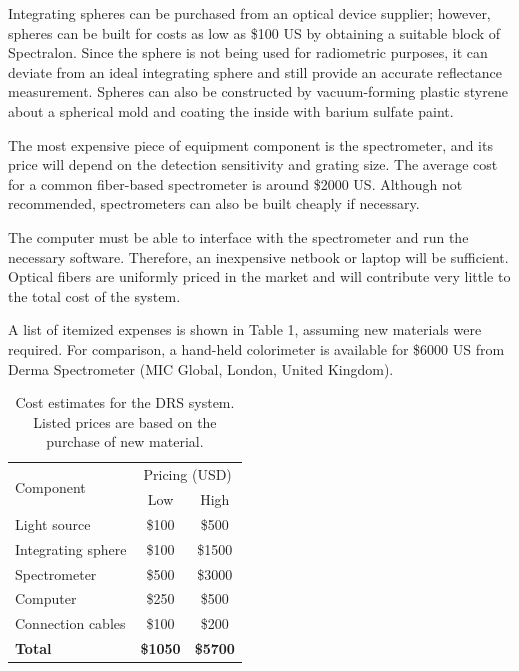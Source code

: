 Integrating spheres can be purchased from an optical device supplier; however, spheres can be built for costs as low as \$100 US by obtaining a suitable block of Spectralon. Since the sphere is not being used for radiometric purposes, it can deviate from an ideal integrating sphere and still provide an accurate reflectance measurement. Spheres can also be constructed by vacuum-forming plastic styrene about a spherical mold and coating the inside with barium sulfate paint.\cite{Glennie2009}

The most expensive piece of equipment component is the spectrometer, and its price will depend on the detection sensitivity and grating size. The average cost for a common fiber-based spectrometer is around \$2000 US. Although not recommended, spectrometers can also be built cheaply if necessary.\cite{Sumriddetchkajorn2012}

The computer must be able to interface with the spectrometer and run the necessary software. Therefore, an inexpensive netbook or laptop will be sufficient. Optical fibers are uniformly priced in the market and will contribute very little to the total cost of the system.

A list of itemized expenses is shown in Table 1, assuming new materials were required. For comparison, a hand-held colorimeter is available for \$6000 US from Derma Spectrometer (MIC Global, London, United Kingdom).

\begin{table}[h]
	\centering
	\caption{Cost estimates for the DRS system. Listed prices are based on the purchase of new material.}
	\label{my-label}
	\begin{tabular}{lcc}
		\toprule
		\multirow{2}{*}{Component} & \multicolumn{2}{c}{Pricing (USD)} \\ \cmidrule(l){2-3} 
		& Low             & High            \\ \midrule
		Light source               & \$100           & \$500           \\
		Integrating sphere\qquad\qquad         & \$100           & \$1500          \\
		Spectrometer               & \$500           & \$3000          \\
		Computer                   & \$250           & \$500           \\
		Connection cables\qquad\qquad          & \$100           & \$200           \\
		\textbf{Total}             & \textbf{\qquad\$1050\qquad} & \textbf{\qquad\$5700\qquad} \\ \bottomrule
	\end{tabular}
\end{table}

